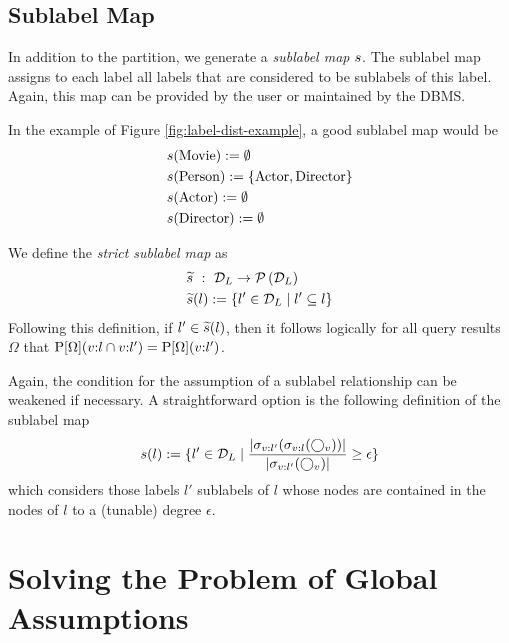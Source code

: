 \subsection{Sublabel Map}
\label{sub:sublabel-map}

In addition to the partition, we generate a \emph{sublabel map} $s$.
The sublabel map assigns to each label all labels that are considered to be
sublabels of this label. Again, this map can be provided by the user or 
maintained by the DBMS.

In the example of Figure \ref{fig:label-dist-example}, a good sublabel map
would be
\begin{align*}
  &s(\text{Movie}) := \emptyset \\
  &s(\text{Person}) := \{ \text{Actor}, \text{Director} \} \\
  &s(\text{Actor}) := \emptyset \\
  &s(\text{Director}) := \emptyset
\end{align*}

We define the \emph{strict sublabel map} as
\begin{align}
\begin{split}
  &\widetilde{s} ~:~ \mathcal{D}_L \rightarrow \mathcal{P}\left(\mathcal{D}_L\right) \\
  &\widetilde{s}(l) :=  \{ l' \in \mathcal{D}_L \mid l' \subseteq l \}
\end{split}
\end{align}
Following this definition, if $l' \in \widetilde{s}(l)$, then it follows
logically for all query results $\Omega$ that
$\operatorname{P}[\Omega](v{:}l \cap v{:}l') = \operatorname{P}[\Omega](v{:}l')$.

\begin{remark}
Again, the condition for the assumption of a sublabel relationship can be
weakened if necessary.
A straightforward option is the following definition of the sublabel map
\[
  s(l) :=  \{ l' \in \mathcal{D}_L \mid
    \frac{{\left \vert \sigma_{v:l'}(\sigma_{v:l}(\bigcirc_{v})) \right \vert}}
         {{\left \vert \sigma_{v:l'}(\bigcirc_{v}) \right \vert}} \geq \epsilon \}
\]
which considers those labels $l'$ sublabels of $l$ whose nodes are contained in
the nodes of $l$ to a (tunable) degree $\epsilon$.
\end{remark}

\section{Solving the Problem of Global Assumptions}

